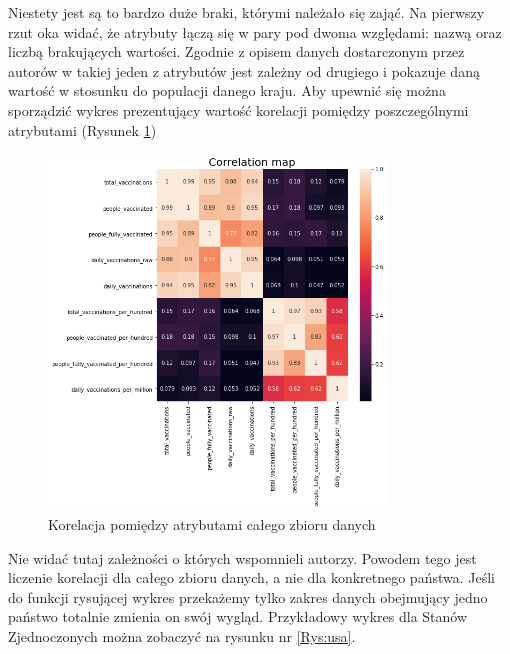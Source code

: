 \documentclass[12pt, oneside, openany]{article}
\begin{document}
Niestety jest są to bardzo duże braki, którymi należało się zająć. Na pierwszy rzut oka widać, że atrybuty łączą się w pary pod dwoma względami: nazwą oraz liczbą brakujących wartości. Zgodnie z opisem danych dostarczonym przez autorów w takiej jeden z atrybutów jest zależny od drugiego i pokazuje daną wartość w stosunku do populacji danego kraju. Aby upewnić się można sporządzić wykres prezentujący wartość korelacji pomiędzy poszczególnymi atrybutami (Rysunek \ref{Rys:cor})

\begin{figure}[h]
\centering
\includegraphics[width=0.8\textwidth]{../img/corelation.png} 
\caption{Korelacja pomiędzy atrybutami całego zbioru danych\label{Rys:cor}}

\end{figure}

Nie widać tutaj zależności o których wspomnieli autorzy. Powodem tego jest liczenie korelacji dla całego zbioru danych, a nie dla konkretnego państwa. Jeśli do funkcji rysującej wykres przekażemy tylko zakres danych obejmujący jedno państwo totalnie zmienia on swój wygląd. Przykładowy wykres dla Stanów Zjednoczonych można zobaczyć na rysunku nr \ref{Rys:usa}.
\end{document}
